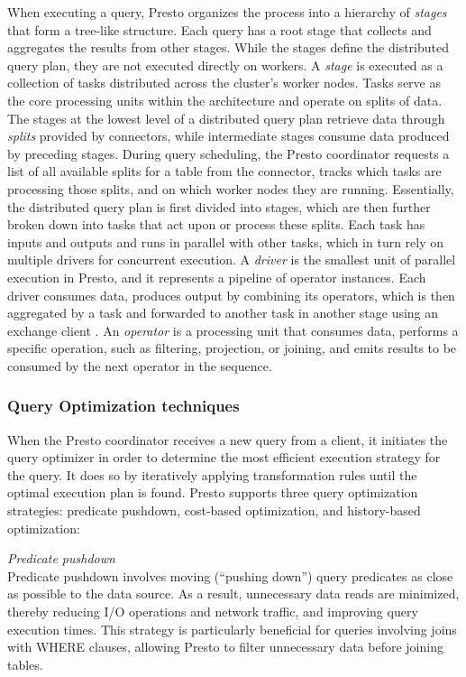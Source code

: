 \documentclass[conference]{IEEEtran}
\begin{document}
When executing a query, Presto organizes the process into a hierarchy of \textit{stages} that form a tree-like structure. Each query has a root stage that collects and aggregates the results from other stages. While the stages define the distributed query plan, they are not executed directly on workers.
A \textit{stage} is executed as a collection of tasks distributed across the cluster’s worker nodes. Tasks serve as the core processing units within the architecture and operate on splits of data. The stages at the lowest level of a distributed query plan retrieve data through \textit{splits} provided by connectors, while intermediate stages consume data produced by preceding stages. During query scheduling, the Presto coordinator requests a list of all available splits for a table from the connector, tracks which tasks are processing those splits, and on which worker nodes they are running.
Essentially, the distributed query plan is first divided into stages, which are then further broken down into tasks that act upon or process these splits.  Each task has inputs and outputs and runs in parallel with other tasks, which in turn rely on multiple drivers for concurrent execution.
A \textit{driver} is the smallest unit of parallel execution in Presto, and it represents a pipeline of operator instances. Each driver consumes data, produces output by combining its operators, which is then aggregated by a task and forwarded to another task in another stage using an exchange client \cite{b2}.
An \textit{operator} is a processing unit that consumes data, performs a specific operation, such as filtering, projection, or joining, and emits results to be consumed by the next operator in the sequence.


\subsubsection{Query Optimization techniques}

When the Presto coordinator receives a new query from a client, it initiates the query optimizer in order to determine the most efficient execution strategy for the query. It does so by iteratively applying transformation rules until the optimal execution plan is found.\cite{b3,b4} Presto supports three query optimization strategies: predicate pushdown, cost-based optimization, and history-based optimization:

\textit{Predicate pushdown} \\
Predicate pushdown involves moving (``pushing down'') query predicates as close as possible to the data source. As a result, unnecessary data reads are minimized, thereby reducing I/O operations and network traffic, and improving query execution times. This strategy is particularly beneficial for queries involving joins with WHERE clauses, allowing Presto to filter unnecessary data before joining tables.\cite{b4}
\end{document}
